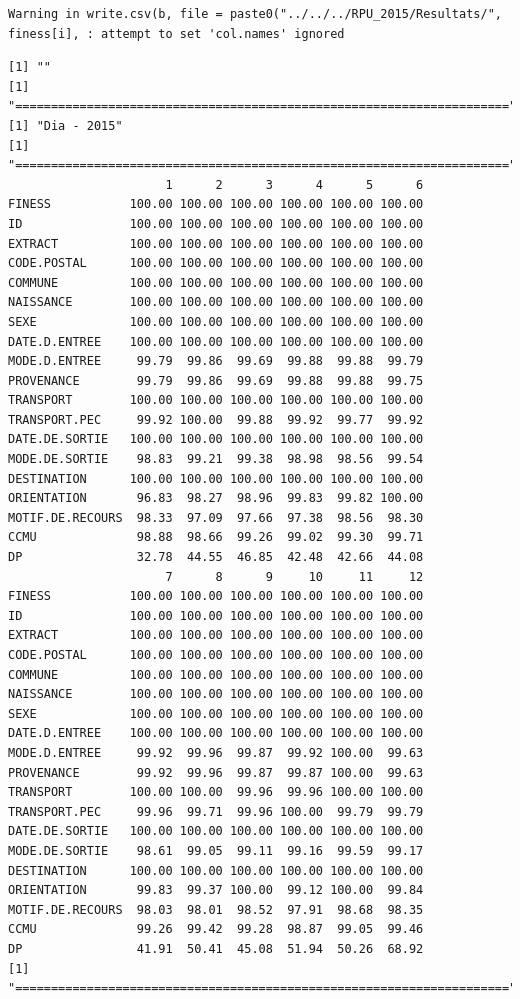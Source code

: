 \documentclass[]{article}
\begin{document}
\begin{verbatim}
Warning in write.csv(b, file = paste0("../../../RPU_2015/Resultats/",
finess[i], : attempt to set 'col.names' ignored
\end{verbatim}

\begin{verbatim}
[1] ""
[1] "====================================================================="
[1] "Dia - 2015"
[1] "====================================================================="
                      1      2      3      4      5      6
FINESS           100.00 100.00 100.00 100.00 100.00 100.00
ID               100.00 100.00 100.00 100.00 100.00 100.00
EXTRACT          100.00 100.00 100.00 100.00 100.00 100.00
CODE.POSTAL      100.00 100.00 100.00 100.00 100.00 100.00
COMMUNE          100.00 100.00 100.00 100.00 100.00 100.00
NAISSANCE        100.00 100.00 100.00 100.00 100.00 100.00
SEXE             100.00 100.00 100.00 100.00 100.00 100.00
DATE.D.ENTREE    100.00 100.00 100.00 100.00 100.00 100.00
MODE.D.ENTREE     99.79  99.86  99.69  99.88  99.88  99.79
PROVENANCE        99.79  99.86  99.69  99.88  99.88  99.75
TRANSPORT        100.00 100.00 100.00 100.00 100.00 100.00
TRANSPORT.PEC     99.92 100.00  99.88  99.92  99.77  99.92
DATE.DE.SORTIE   100.00 100.00 100.00 100.00 100.00 100.00
MODE.DE.SORTIE    98.83  99.21  99.38  98.98  98.56  99.54
DESTINATION      100.00 100.00 100.00 100.00 100.00 100.00
ORIENTATION       96.83  98.27  98.96  99.83  99.82 100.00
MOTIF.DE.RECOURS  98.33  97.09  97.66  97.38  98.56  98.30
CCMU              98.88  98.66  99.26  99.02  99.30  99.71
DP                32.78  44.55  46.85  42.48  42.66  44.08
                      7      8      9     10     11     12
FINESS           100.00 100.00 100.00 100.00 100.00 100.00
ID               100.00 100.00 100.00 100.00 100.00 100.00
EXTRACT          100.00 100.00 100.00 100.00 100.00 100.00
CODE.POSTAL      100.00 100.00 100.00 100.00 100.00 100.00
COMMUNE          100.00 100.00 100.00 100.00 100.00 100.00
NAISSANCE        100.00 100.00 100.00 100.00 100.00 100.00
SEXE             100.00 100.00 100.00 100.00 100.00 100.00
DATE.D.ENTREE    100.00 100.00 100.00 100.00 100.00 100.00
MODE.D.ENTREE     99.92  99.96  99.87  99.92 100.00  99.63
PROVENANCE        99.92  99.96  99.87  99.87 100.00  99.63
TRANSPORT        100.00 100.00  99.96  99.96 100.00 100.00
TRANSPORT.PEC     99.96  99.71  99.96 100.00  99.79  99.79
DATE.DE.SORTIE   100.00 100.00 100.00 100.00 100.00 100.00
MODE.DE.SORTIE    98.61  99.05  99.11  99.16  99.59  99.17
DESTINATION      100.00 100.00 100.00 100.00 100.00 100.00
ORIENTATION       99.83  99.37 100.00  99.12 100.00  99.84
MOTIF.DE.RECOURS  98.03  98.01  98.52  97.91  98.68  98.35
CCMU              99.26  99.42  99.28  98.87  99.05  99.46
DP                41.91  50.41  45.08  51.94  50.26  68.92
[1] "====================================================================="
\end{verbatim}
\end{document}
